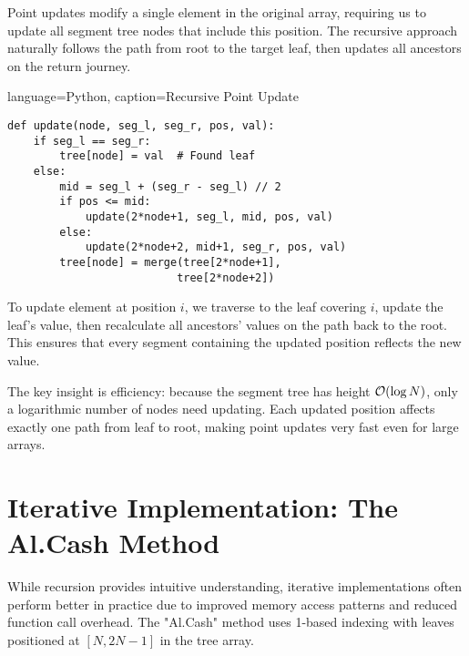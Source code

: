 Point updates modify a single element in the original array, requiring us to update all segment tree nodes that include this position. The recursive approach naturally follows the path from root to the target leaf, then updates all ancestors on the return journey.

\begin{marginlisting}[0pt]{language=Python, caption=Recursive Point Update}
\begin{lstlisting}
def update(node, seg_l, seg_r, pos, val):
    if seg_l == seg_r:
        tree[node] = val  # Found leaf
    else:
        mid = seg_l + (seg_r - seg_l) // 2
        if pos <= mid:
            update(2*node+1, seg_l, mid, pos, val)
        else:
            update(2*node+2, mid+1, seg_r, pos, val)
        tree[node] = merge(tree[2*node+1], 
                          tree[2*node+2])
\end{lstlisting}
\end{marginlisting}

To update element at position $i$, we traverse to the leaf covering $i$, update the leaf's value, then recalculate all ancestors' values on the path back to the root. This ensures that every segment containing the updated position reflects the new value.

\begin{algorithm}[H]
\caption{Recursive update algorithm}
\end{algorithm}

The key insight is efficiency: because the segment tree has height $\mathcal{O}(\log N)$, only a logarithmic number of nodes need updating. Each updated position affects exactly one path from leaf to root, making point updates very fast even for large arrays.

\section{Iterative Implementation: The Al.Cash Method}
\label{sec:iterative_al_cash}

While recursion provides intuitive understanding, iterative implementations often perform better in practice due to improved memory access patterns and reduced function call overhead. The "Al.Cash" method uses 1-based indexing with leaves positioned at $[N, 2N-1]$ in the tree array.

